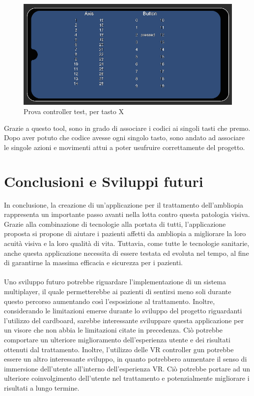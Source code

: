 \documentclass[
a4paper,
cleardoublepage=empty,
headings=twolinechapter,
numbers=autoenddot,
]{scrbook}
\begin{document}
    \begin{figure}[h]
    	\centering
    	\includegraphics[width=0.7\linewidth]{image/controller_test}
    	\caption{Prova controller test, per tasto X}
    	\label{fig:controller_test}
    \end{figure}
    Grazie a questo tool, sono in grado di associare i codici ai singoli tasti che premo.
    Dopo aver potuto che codice avesse ogni singolo tasto, sono andato ad associare le singole azioni e movimenti attui a poter usufruire correttamente del progetto.
    \chapter{Conclusioni e Sviluppi futuri}
   In conclusione, la creazione di un'applicazione per il trattamento dell'ambliopia rappresenta un importante passo avanti nella lotta contro questa patologia visiva. Grazie alla combinazione di tecnologie alla portata di tutti, l'applicazione proposta si propone di aiutare i pazienti affetti da ambliopia a migliorare la loro acuità visiva e la loro qualità di vita. Tuttavia, come tutte le tecnologie sanitarie, anche questa applicazione necessita di essere testata ed evoluta nel tempo, al fine di garantirne la massima efficacia e sicurezza per i pazienti.\\\\
   
   Uno sviluppo futuro potrebbe riguardare l'implementazione di un sistema multiplayer, il quale permetterebbe ai pazienti di sentirsi meno soli durante questo percorso aumentando così l'esposizione al trattamento. Inoltre, considerando le limitazioni emerse durante lo sviluppo del progetto riguardanti l'utilizzo del cardboard, sarebbe interessante sviluppare questa applicazione per un visore che non abbia le limitazioni citate in precedenza. Ciò potrebbe comportare un ulteriore miglioramento dell'esperienza utente e dei risultati ottenuti dal trattamento. Inoltre, l'utilizzo delle VR controller gun potrebbe essere un altro interessante sviluppo, in quanto potrebbero aumentare il senso di immersione dell'utente all'interno dell'esperienza VR. Ciò potrebbe portare ad un ulteriore coinvolgimento dell'utente nel trattamento e potenzialmente migliorare i risultati a lungo termine.\\\\
  
\end{document}
